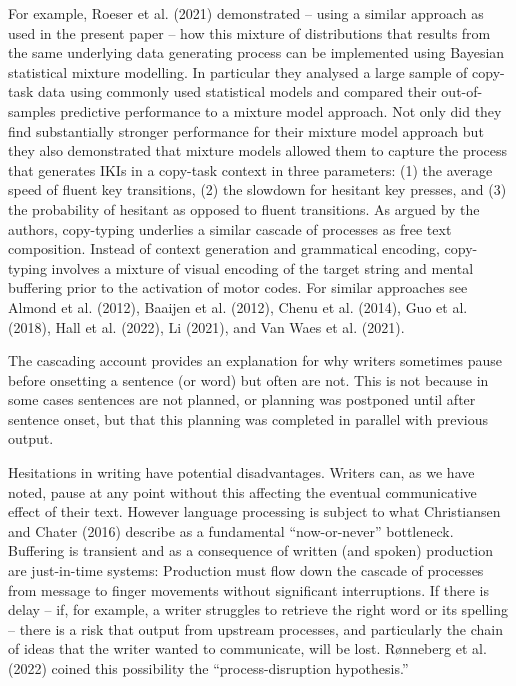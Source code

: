 \documentclass[
  english,
  man,floatsintext]{apa7}
\begin{document}
For example, Roeser et al. (2021) demonstrated -- using a similar approach as used in the present paper -- how this mixture of distributions that results from the same underlying data generating process can be implemented using Bayesian statistical mixture modelling. In particular they analysed a large sample of copy-task data using commonly used statistical models and compared their out-of-samples predictive performance to a mixture model approach. Not only did they find substantially stronger performance for their mixture model approach but they also demonstrated that mixture models allowed them to capture the process that generates IKIs in a copy-task context in three parameters: (1) the average speed of fluent key transitions, (2) the slowdown for hesitant key presses, and (3) the probability of hesitant as opposed to fluent transitions. As argued by the authors, copy-typing underlies a similar cascade of processes as free text composition. Instead of context generation and grammatical encoding, copy-typing involves a mixture of visual encoding of the target string and mental buffering prior to the activation of motor codes. For similar approaches see Almond et al. (2012), Baaijen et al. (2012), Chenu et al. (2014), Guo et al. (2018), Hall et al. (2022), Li (2021), and Van Waes et al. (2021).

The cascading account provides an explanation for why writers sometimes pause before onsetting a sentence (or word) but often are not. This is not because in some cases sentences are not planned, or planning was postponed until after sentence onset, but that this planning was completed in parallel with previous output.

Hesitations in writing have potential disadvantages. Writers can, as we have noted, pause at any point without this affecting the eventual communicative effect of their text. However language processing is subject to what Christiansen and Chater (2016) describe as a fundamental \enquote{now-or-never} bottleneck. Buffering is transient and as a consequence of written (and spoken) production are just-in-time systems: Production must flow down the cascade of processes from message to finger movements without significant interruptions. If there is delay -- if, for example, a writer struggles to retrieve the right word or its spelling -- there is a risk that output from upstream processes, and particularly the chain of ideas that the writer wanted to communicate, will be lost. Rønneberg et al. (2022) coined this possibility the \enquote{process-disruption hypothesis.}
\end{document}
